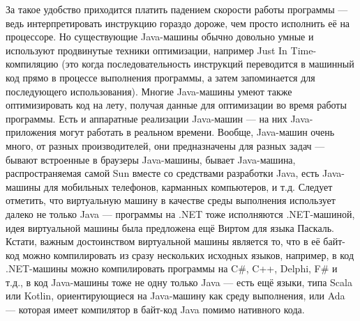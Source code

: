 \documentclass[a5paper]{article}
\begin{document}
За такое удобство приходится платить падением скорости работы программы --- ведь интерпретировать инструкцию гораздо дороже, чем просто исполнить её на процессоре. Но существующие Java-машины обычно довольно умные и используют продвинутые техники оптимизации, например Just In Time-компиляцию (это когда последовательность инструкций переводится в машинный код прямо в процессе выполнения программы, а затем запоминается для последующего использования). Многие Java-машины умеют также оптимизировать код на лету, получая данные для оптимизации во время работы программы. Есть и аппаратные реализации Java-машин --- на них Java-приложения могут работать в реальном времени. Вообще, Java-машин очень много, от разных производителей, они предназначены для разных задач --- бывают встроенные в браузеры Java-машины, бывает Java-машина, распространяемая самой Sun вместе со средствами разработки Java, есть Java-машины для мобильных телефонов, карманных компьютеров, и т.д. Следует отметить, что виртуальную машину в качестве среды выполнения использует далеко не только Java --- программы на .NET тоже исполняются .NET-машиной, идея виртуальной машины была предложена ещё Виртом для языка Паскаль. Кстати, важным достоинством виртуальной машины является то, что в её байт-код можно компилировать из сразу нескольких исходных языков, например, в код .NET-машины можно компилировать программы на C\#, C++, Delphi, F\# и т.д., в код Java-машины тоже не одну только Java --- есть ещё языки, типа Scala или Kotlin, ориентирующиеся на Java-машину как среду выполнения, или Ada --- которая имеет компилятор в байт-код Java помимо нативного кода.
\end{document}
